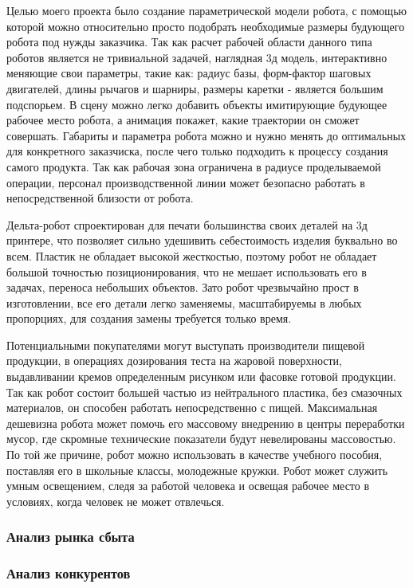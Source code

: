 Целью моего проекта было создание параметрической модели робота, с помощью которой можно относительно просто подобрать необходимые размеры будующего робота под нужды заказчика. Так как расчет рабочей области данного типа роботов является не тривиальной задачей, наглядная 3д модель, интерактивно меняющие свои параметры, такие как: радиус базы, форм-фактор шаговых двигателей, длины рычагов и шарниры, размеры каретки - является большим подспорьем. В сцену можно легко добавить объекты имитирующие будующее рабочее место робота, а анимация покажет, какие траектории он сможет совершать. Габариты и параметра робота можно и нужно менять до оптимальных для конкретного заказчиска, после чего только подходить к процессу создания самого продукта. Так как рабочая зона ограничена в радиусе проделываемой операции, персонал производственной линии может безопасно работать в непосредственной близости от робота.

Дельта-робот спроектирован для печати большинства своих деталей на 3д принтере, что позволяет сильно удешивить себестоимость изделия буквально во всем. Пластик не обладает высокой жесткостью, поэтому робот не обладает большой точностью позиционирования, что не мешает использовать его в задачах, переноса небольших объектов. Зато робот чрезвычайно прост в изготовлении, все его детали легко заменяемы, масштабируемы в любых пропорциях, для создания замены требуется только время.

Потенциальными покупателями могут выступать производители пищевой продукции, в операциях дозирования теста на жаровой поверхности, выдавливании кремов определенным рисунком или фасовке готовой продукции. Так как робот состоит большей частью из нейтрального пластика, без смазочных материалов, он способен работать непосредственно с пищей. Максимальная дешевизна робота может помочь его массовому внедрению в центры переработки мусор, где скромные технические показатели будут невелированы массовостью. По той же причине, робот можно использовать в качестве учебного пособия, поставляя его в школьные классы, молодежные кружки. Робот может служить умным освещением, следя за работой человека и освещая рабочее место в условиях, когда человек не может отвлечься.
\subsubsection{Анализ рынка сбыта}



\subsubsection{Анализ конкурентов}
